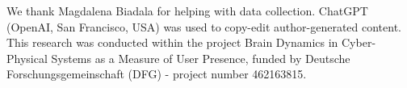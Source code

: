 \begin{acks}
We thank Magdalena Biadala for helping with data collection. ChatGPT (OpenAI, San Francisco, USA) was used to copy-edit author-generated content. This research was conducted within the project Brain Dynamics in Cyber-Physical Systems as a Measure of User Presence, funded by Deutsche Forschungsgemeinschaft (DFG) - project number 462163815. %
\end{acks}